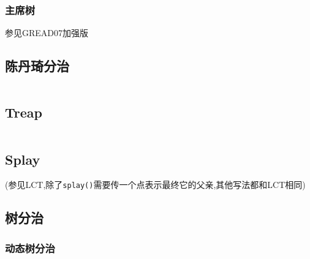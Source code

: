 \documentclass[a4paper]{article}
\begin{document}
\begin{multicols}{2}
				\subsubsection{主席树}
					参见GREAD07加强版

			\subsection{陈丹琦分治}
				\inputminted{cpp}{../src/datastructure/CDQ分治.cpp}





			\subsection{Treap}
				\inputminted{cpp}{../src/datastructure/Treap.cpp}
			




			\subsection{Splay}
				(参见LCT,除了\texttt{splay()}需要传一个点表示最终它的父亲,其他写法都和LCT相同)
			
			\subsection{树分治}

				
				\subsubsection{动态树分治}
					\inputminted{cpp}{../src/datastructure/动态树分治.cpp}


\end{multicols}
\end{document}
